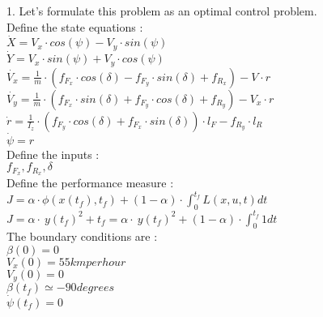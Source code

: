 \documentclass{article}
\begin{document}
1. Let's formulate this problem as an optimal control problem. \\

Define the state equations : \\

$\dot{X} = V_{x} \cdot cos(\psi) -V_{y} \cdot sin(\psi) $\\

$\dot{Y} = V_{x} \cdot sin(\psi) + V_{y} \cdot cos(\psi)$ \\

$\dot{V_{x}} = \frac{1}{m} \cdot (f_{F_{x}} \cdot cos(\delta) - f_{F_{y}} \cdot sin(\delta) + f_{R_{x}}) - V_{} \cdot r $\\

$\dot{V_{y}} = \frac{1}{m} \cdot (f_{F_{x}} \cdot sin(\delta) + f_{F_{y}} \cdot cos(\delta) + f_{R_{y}}) - V_{x} \cdot r $\\

$\dot{r} = \frac{1}{I_{z}} \cdot (f_{F_{y}} \cdot cos(\delta) + f_{F_{x}} \cdot sin(\delta)) \cdot l_{F} - f_{R_{y}} \cdot l_{R}$\\

$\dot{\psi} = r $\\


Define the inputs : \\

$f_{F_{x}} , f_{R_{x}} , \delta$ \\

Define the performance measure : \\

$J = \alpha \cdot \phi(x(t_{f}),t_{f}) + (1 - \alpha ) \cdot \int_0^{t_{f}} L(x,u,t) dt$\\

$J = \alpha \cdot\ y(t_{f})^2 + t_{f} = \alpha \cdot\ y(t_{f})^2 + (1-\alpha) \cdot \int_0^{t_{f}} 1  dt$ \\

The boundary conditions are : \\

$\beta(0) = 0$\\

$V_{x}(0) = 55 km per hour $\\

$V_{y}(0) = 0$\\

$\beta(t_{f}) \simeq - 90 degrees$\\

$\dot{\psi}(t_{f}) = 0$\\
\end{document}
